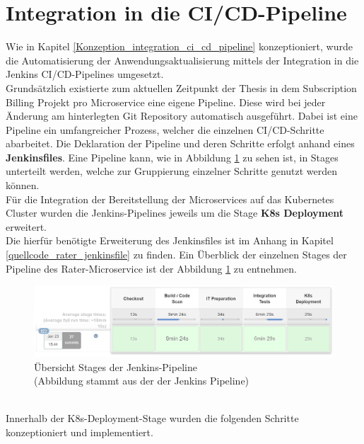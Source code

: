 \section{Integration in die \acs{CI}/\acs{CD}-Pipeline}
\label{Umsetzung_CI_CD_Integration}
Wie in Kapitel \ref{Konzeption_integration_ci_cd_pipeline} konzeptioniert, wurde die Automatisierung der Anwendungsaktualisierung mittels der Integration in die Jenkins \ac{CI}/\ac{CD}-Pipelines umgesetzt.\\
Grundsätzlich existierte zum aktuellen Zeitpunkt der Thesis in dem Subscription Billing Projekt pro Microservice eine eigene Pipeline. Diese wird bei jeder Änderung am hinterlegten Git Repository automatisch ausgeführt. Dabei ist eine Pipeline ein umfangreicher Prozess, welcher die einzelnen \ac{CI}/\ac{CD}-Schritte abarbeitet. Die Deklaration der Pipeline und deren Schritte erfolgt anhand eines \textbf{Jenkinsfiles}.
Eine Pipeline kann, wie in Abbildung \ref{picture_jenkins_pipeline} zu sehen ist, in Stages unterteilt werden, welche zur Gruppierung einzelner Schritte genutzt werden können.\autocite[Vgl.][]{JenkinsAuthors.20190308}\\
Für die Integration der Bereitstellung der Microservices auf das Kubernetes Cluster wurden die Jenkins-Pipelines jeweils um die Stage \textbf{K8s Deployment} erweitert.\\
Die hierfür benötigte Erweiterung des Jenkinsfiles ist im Anhang in Kapitel \ref{quellcode_rater_jenkinsfile} zu finden. Ein Überblick der einzelnen Stages der Pipeline des Rater-Microservice ist der Abbildung \ref{picture_jenkins_pipeline} zu entnehmen. 
\\
\begin{figure}[h]
	\begin{center}
		\includegraphics[width=16cm]{img/Jenkins_Pipeline.JPG}
		\caption[Übersicht Stages der Jenkins-Pipeline]{Übersicht Stages der Jenkins-Pipeline\\(Abbildung stammt aus der der Jenkins Pipeline)}
		\label{picture_jenkins_pipeline}
	\end{center}
\end{figure}
\\
Innerhalb der K8s-Deployment-Stage wurden die folgenden Schritte konzeptioniert und implementiert. 
